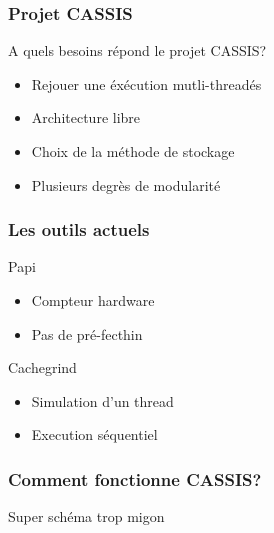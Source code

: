 \begin{frame}
  \frametitle{Projet CASSIS}
  A quels besoins répond le projet CASSIS?
  \newline
  \begin{itemize}  
  \item Rejouer une éxécution mutli-threadés
    \newline
  \item Architecture libre
    \newline
  \item Choix de la méthode de stockage
    \newline
  \item Plusieurs degrès de modularité
  \end{itemize}  
\end{frame}


\begin{frame}
  \frametitle{Les outils actuels}
  \begin{block}{Papi}
  \begin{itemize}
    \item Compteur hardware
    \item Pas de pré-fecthin
    \end{itemize}    
  \end{block}
  \begin{block}{Cachegrind}
    \begin{itemize}
    \item Simulation d'un thread
    \item Execution séquentiel
    \end{itemize}
  \end{block}   
\end{frame}


\begin{frame}
  \frametitle{Comment fonctionne CASSIS?}
  Super schéma trop migon
\end{frame}
